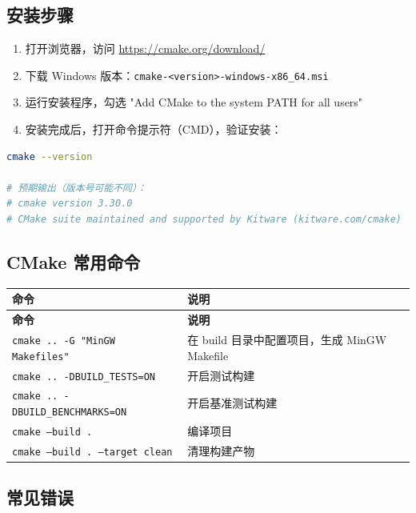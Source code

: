 ﻿\documentclass[12pt,a4paper,oneside]{ctexbook}
\begin{document}
\subsection{安装步骤}

\begin{enumerate}
    \item 打开浏览器，访问 \url{https://cmake.org/download/}
    \item 下载 Windows 版本：\texttt{cmake-<version>-windows-x86\_64.msi}
    \item 运行安装程序，勾选 "Add CMake to the system PATH for all users"
    \item 安装完成后，打开命令提示符（CMD），验证安装：
\end{enumerate}

\begin{lstlisting}[language=bash, caption={验证 CMake 安装}]
cmake --version

# 预期输出（版本号可能不同）：
# cmake version 3.30.0
# CMake suite maintained and supported by Kitware (kitware.com/cmake)
\end{lstlisting}

\subsection{CMake 常用命令}

\begin{longtable}{p{5cm}p{8cm}}
    \toprule
    \textbf{命令} & \textbf{说明} \\
    \midrule
    \endfirsthead
    \toprule
    \textbf{命令} & \textbf{说明} \\
    \midrule
    \endhead
    \bottomrule
    \endfoot
    \texttt{cmake .. -G "MinGW Makefiles"} & 在 build 目录中配置项目，生成 MinGW Makefile \\
    \texttt{cmake .. -DBUILD\_TESTS=ON} & 开启测试构建 \\
    \texttt{cmake .. -DBUILD\_BENCHMARKS=ON} & 开启基准测试构建 \\
    \texttt{cmake --build .} & 编译项目 \\
    \texttt{cmake --build . --target clean} & 清理构建产物 \\
    \bottomrule
\end{longtable}

\subsection{常见错误}
\end{document}
